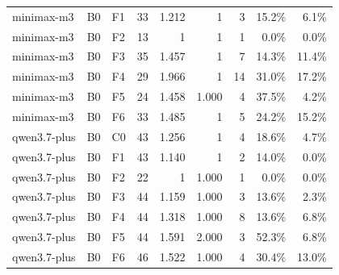 \begin{tabular}{lllrrrrrr}
minimax-m3 & B0 & F1 & 33 & 1.212 & 1 & 3 & 15.2\% & 6.1\% \\
minimax-m3 & B0 & F2 & 13 & 1 & 1 & 1 & 0.0\% & 0.0\% \\
minimax-m3 & B0 & F3 & 35 & 1.457 & 1 & 7 & 14.3\% & 11.4\% \\
minimax-m3 & B0 & F4 & 29 & 1.966 & 1 & 14 & 31.0\% & 17.2\% \\
minimax-m3 & B0 & F5 & 24 & 1.458 & 1.000 & 4 & 37.5\% & 4.2\% \\
minimax-m3 & B0 & F6 & 33 & 1.485 & 1 & 5 & 24.2\% & 15.2\% \\
qwen3.7-plus & B0 & C0 & 43 & 1.256 & 1 & 4 & 18.6\% & 4.7\% \\
qwen3.7-plus & B0 & F1 & 43 & 1.140 & 1 & 2 & 14.0\% & 0.0\% \\
qwen3.7-plus & B0 & F2 & 22 & 1 & 1.000 & 1 & 0.0\% & 0.0\% \\
qwen3.7-plus & B0 & F3 & 44 & 1.159 & 1.000 & 3 & 13.6\% & 2.3\% \\
qwen3.7-plus & B0 & F4 & 44 & 1.318 & 1.000 & 8 & 13.6\% & 6.8\% \\
qwen3.7-plus & B0 & F5 & 44 & 1.591 & 2.000 & 3 & 52.3\% & 6.8\% \\
qwen3.7-plus & B0 & F6 & 46 & 1.522 & 1.000 & 4 & 30.4\% & 13.0\% \\
\bottomrule
\end{tabular}

